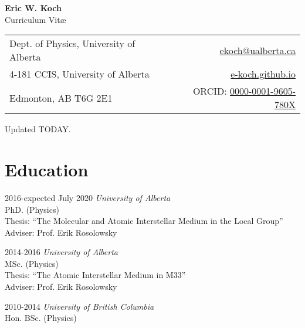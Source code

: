 \documentclass[letterpaper,11pt]{article}
\makeatletter
\newcommand{\myname}{Eric W. Koch}
\newcommand{\myaffil}{Dept. of Physics, University of Alberta}
\newcommand{\myemail}{ekoch@ualberta.ca}
\newcommand{\mypostlineone}{4-181 CCIS, University of Alberta}
\newcommand{\mypostlinetwo}{Edmonton, AB T6G 2E1}
\newcommand{\mysite}{e-koch.github.io}
\newcommand{\myorcid}{https://orcid.org/0000-0001-9605-780X}
\newlength{\mainindent} \setlength{\mainindent}{12pt}
\newlength{\contentindent} \setlength{\contentindent}{19ex}
\newenvironment{datelist}{
  \begingroup
  \raggedright
  \begin{description}[labelindent=\mainindent,leftmargin=\contentindent,
      style=sameline,font=\normalfont,topsep=0pt,partopsep=0pt,parsep=0pt,
      itemsep=4pt]
}{
  \end{description}
  \endgroup
}
\makeatother
\begin{document}
\pagestyle{fancy}
\lhead{} \chead{} \rhead{} \renewcommand{\headrule}{\relax}
\cfoot{\thepage/\pageref*{LastPage}}
\rfoot{\textsc{\myname}}

\begin{center}
\textbf{\Large \myname} \\
{\large Curriculum Vit\ae}
\end{center}

\medskip

\begin{tabular*}{\textwidth}{@{\extracolsep{\fill}}lr}
\myaffil &
 \textsf{\href{mailto:\myemail}{\myemail}} \\
\mypostlineone &
 \url{\mysite} \\
\mypostlinetwo &
  \textsf{ORCID: \href{\myorcid}{0000-0001-9605-780X}} \\
\end{tabular*}

\medskip


Updated %
TODAY.

\section*{Education}
\begin{datelist}
\item[2016-expected July 2020]
  \emph{University of Alberta} \\
  PhD. (Physics) \\
  Thesis: {``The Molecular and Atomic Interstellar Medium in the Local Group''} \\
  Adviser: Prof. Erik Rosolowsky
\item[2014-2016]
  \emph{University of Alberta} \\
  MSc. (Physics) \\
  Thesis: {``The Atomic Interstellar Medium in M33''} \\
  Adviser: Prof. Erik Rosolowsky
\item[2010-2014]
  \emph{University of British Columbia} \\
  Hon. BSc. (Physics)
\end{datelist}
\end{document}
